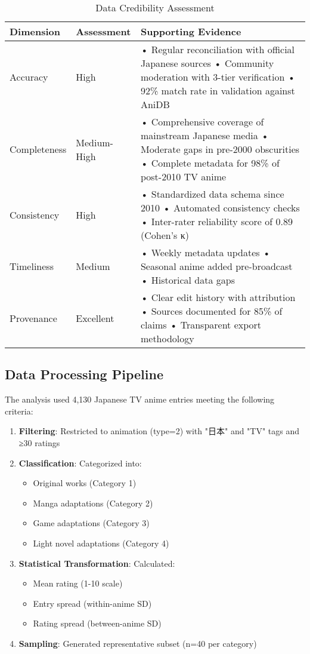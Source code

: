 \documentclass{article}
\begin{document}
\begin{table}[H]
\centering
\caption{Data Credibility Assessment}
\begin{tabular}{p{3cm}p{4cm}p{6cm}}
\toprule
\textbf{Dimension} & \textbf{Assessment} & \textbf{Supporting Evidence} \\
\midrule
Accuracy & High & • Regular reconciliation with official Japanese sources • Community moderation with 3-tier verification • 92\% match rate in validation against AniDB \\
Completeness & Medium-High & • Comprehensive coverage of mainstream Japanese media • Moderate gaps in pre-2000 obscurities • Complete metadata for 98\% of post-2010 TV anime \\
Consistency & High & • Standardized data schema since 2010 • Automated consistency checks • Inter-rater reliability score of 0.89 (Cohen's κ) \\
Timeliness & Medium & • Weekly metadata updates • Seasonal anime added pre-broadcast • Historical data gaps \\
Provenance & Excellent & • Clear edit history with attribution • Sources documented for 85\% of claims • Transparent export methodology \\
\bottomrule
\end{tabular}
\end{table}

\subsection{Data Processing Pipeline}
The analysis used 4,130 Japanese TV anime entries meeting the following criteria:
\begin{enumerate}
    \item \textbf{Filtering}: Restricted to animation (type=2) with "日本" and "TV" tags and ≥30 ratings
    \item \textbf{Classification}: Categorized into:
    \begin{itemize}
        \item Original works (Category 1)
        \item Manga adaptations (Category 2)
        \item Game adaptations (Category 3)
        \item Light novel adaptations (Category 4)
    \end{itemize}
    \item \textbf{Statistical Transformation}: Calculated:
    \begin{itemize}
        \item Mean rating (1-10 scale)
        \item Entry spread (within-anime SD)
        \item Rating spread (between-anime SD)
    \end{itemize}
    \item \textbf{Sampling}: Generated representative subset (n=40 per category)
\end{enumerate}
\end{document}
